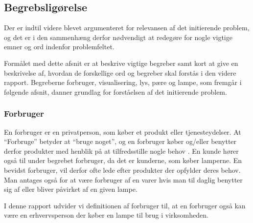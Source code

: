 \subsection{Begrebsligørelse}
Der er indtil videre blevet  argumenteret for relevansen af det initierende problem, og det er i den sammenhæng derfor nødvendigt at redegøre for nogle vigtige emner og ord indenfor problemfeltet. 

Formålet med dette afsnit er at beskrive vigtige begreber samt kort at give en beskrivelse af, hvordan de forskellige ord og begreber skal forstås i den videre rapport. Begreberne forbruger, visualisering, lys, pære og lampe, som fremgår i følgende afsnit, danner grundlag for forståelsen af det initierende problem.



\subsubsection{Forbruger}
En forbruger er en privatperson, som køber et produkt eller tjenesteydelser. At “Forbruge” betyder at “bruge noget”, og en forbruger køber og/eller benytter derfor produkter med henblik på at tilfredsstille nogle behov \cite{forbrugerportalen}. En kunde hører også til under begrebet forbruger, da det er kunderne, som køber lamperne. En bevidst forbruger, vil derfor ofte lede efter produkter der opfylder deres behov. Man antages også for at være forbruger af en varer hvis man til daglig benytter sig af eller bliver påvirket af en given lampe. 

I denne rapport udvider vi definitionen af forbruger til, at en forbruger også kan være en erhvervsperson der køber en lampe til brug i virksomheden. 
 


